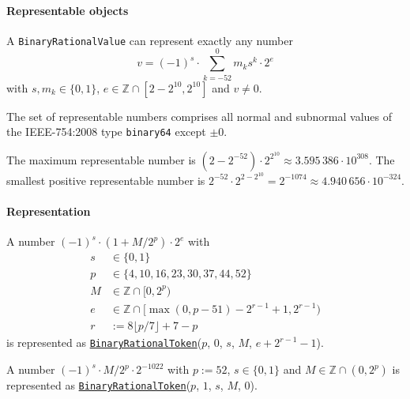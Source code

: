 \documentclass[headings=normal, headsepline, numbers=noenddot, fleqn, a4paper]{scrartcl}
\let\mathbbm\mathds
\newcommand{\SetOfIntegers}{\mathbbm{Z}}
\newcommand{\DborSyntaxIdent}[1]{\texttt{#1}}
\newcommand{\DborSyntaxIdentRef}[1]{\hyperlink{sec:def:#1}{\DborSyntaxIdent{#1}}}
\begin{document}
    \paragraph{Representable objects}

    A \DborSyntaxIdent{BinaryRationalValue} can represent exactly any number
    \begin{equation}
        v = (-1)^s \cdot \sum_{k = -52}^0 m_k s^k \cdot 2^e
    \end{equation}
    with $s, m_k \in \{0, 1\}$, $e \in \SetOfIntegers \cap [2 - 2^{10}, 2^{10}]$ and $v \ne 0$.

    The set of representable numbers comprises all normal and subnormal values of the IEEE-754:2008 type
    \texttt{binary64} except $\pm 0$.

    \smallskip
    The maximum representable number is $(2 - 2^{-52}) \cdot 2^{2^{10}} \approx 3.595\,386 \cdot 10^{308}$.
    The smallest positive representable number is $2^{-52} \cdot 2^{2-2^{10}} = 2^{-1074}
    \approx 4.940\,656 \cdot 10^{-324}$.

    \paragraph{Representation}

    A number $(-1)^s \cdot (1 + M/2^p) \cdot 2^e$ with
    \begin{align*}
        s & \in \{0, 1\} \\
        p & \in \{4, 10, 16, 23, 30, 37, 44, 52\} \\
        M & \in \SetOfIntegers \cap [0, 2^p) \\
        e & \in \SetOfIntegers \cap [\max(0, p - 51) - 2^{r - 1} + 1, 2^{r - 1}) \\
        r & := 8 \lfloor p / 7 \rfloor + 7 - p
    \end{align*}%
    is represented as
    \DborSyntaxIdentRef{BinaryRationalToken}($p$, $0$, $s$, $M$, $e + 2^{r - 1} - 1$).

    A number $(-1)^s \cdot M/2^p \cdot 2^{-1022}$ with $p := 52$, $s \in \{0, 1\}$ and
    $M \in \SetOfIntegers \cap (0, 2^p)$ is represented as
    \DborSyntaxIdentRef{BinaryRationalToken}($p$, $1$, $s$, $M$, $0$).
\end{document}
